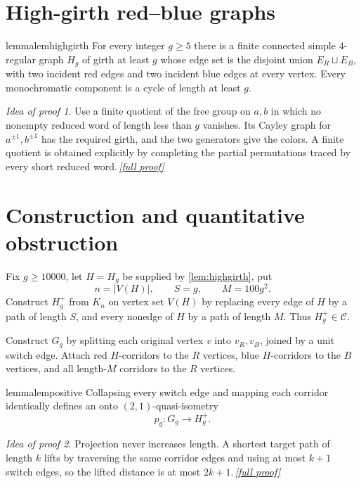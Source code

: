 \documentclass[11pt,a4paper]{article}
\theoremstyle{plain}
\theoremstyle{definition}
\theoremstyle{remark}
\newtheorem*{proofidea}{Idea of proof}
\newcommand{\fullproofref}[1]{\,\hyperref[#1]{\textit{[full proof]}}}
\newcommand{\cC}{\mathcal C}
\newcommand{\Gg}{G_g}
\newcommand{\Hp}{H_g^{+}}
\begin{document}
\section{High-girth red--blue graphs}\label{sec:highgirth}

\begin{restatable}{lemma}{lemhighgirth}\label{lem:highgirth}
For every integer $g\ge5$ there is a finite connected simple $4$-regular graph $H_g$ of girth at least $g$ whose edge set is the disjoint union $E_R\sqcup E_B$, with two incident red edges and two incident blue edges at every vertex. Every monochromatic component is a cycle of length at least $g$.
\end{restatable}
\begin{proofidea}
Use a finite quotient of the free group on $a,b$ in which no nonempty reduced word of length less than $g$ vanishes. Its Cayley graph for $a^{\pm1},b^{\pm1}$ has the required girth, and the two generators give the colors. A finite quotient is obtained explicitly by completing the partial permutations traced by every short reduced word.\fullproofref{pf:highgirth}
\end{proofidea}

\section{Construction and quantitative obstruction}\label{sec:construction}

Fix $g\ge10000$, let $H=H_g$ be supplied by \cref{lem:highgirth}, put
\[
 n=|V(H)|,\qquad S=g,\qquad M=100g^2.
\tag{6.1}
\]
Construct $\Hp$ from $K_n$ on vertex set $V(H)$ by replacing every edge of $H$ by a path of length $S$, and every nonedge of $H$ by a path of length $M$. Thus $\Hp\in\cC$.

Construct $\Gg$ by splitting each original vertex $v$ into $v_R,v_B$, joined by a unit switch edge. Attach red $H$-corridors to the $R$ vertices, blue $H$-corridors to the $B$ vertices, and all length-$M$ corridors to the $R$ vertices.

\begin{restatable}{lemma}{lempositive}\label{lem:positive}
Collapsing every switch edge and mapping each corridor identically defines an onto $(2,1)$-quasi-isometry
\[
 p_g\colon\Gg\longrightarrow\Hp.
\]
\end{restatable}
\begin{proofidea}
Projection never increases length. A shortest target path of length $k$ lifts by traversing the same corridor edges and using at most $k+1$ switch edges, so the lifted distance is at most $2k+1$.\fullproofref{pf:positive}
\end{proofidea}
\end{document}
